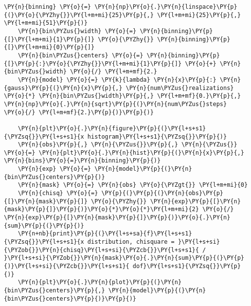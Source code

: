 \begin{Verbatim}[label=\makebox{\href{https://github.com/unipi-physics-labs/lab1-sheets/tree/main/snippy/random_walk.py}{https://github.com/.../random\_walk.py}},commandchars=\\\{\}]
    \PY{n}{binning} \PY{o}{=} \PY{n}{np}\PY{o}{.}\PY{n}{linspace}\PY{p}{(}\PY{o}{\PYZhy{}}\PY{l+m+mi}{25}\PY{p}{,} \PY{l+m+mi}{25}\PY{p}{,} \PY{l+m+mi}{51}\PY{p}{)}
    \PY{n}{bin\PYZus{}width} \PY{o}{=} \PY{n}{binning}\PY{p}{[}\PY{l+m+mi}{1}\PY{p}{]} \PY{o}{\PYZhy{}} \PY{n}{binning}\PY{p}{[}\PY{l+m+mi}{0}\PY{p}{]}
    \PY{n}{bin\PYZus{}centers} \PY{o}{=} \PY{n}{binning}\PY{p}{[}\PY{p}{:}\PY{o}{\PYZhy{}}\PY{l+m+mi}{1}\PY{p}{]} \PY{o}{+} \PY{n}{bin\PYZus{}width} \PY{o}{/} \PY{l+m+mf}{2.}
    \PY{n}{model} \PY{o}{=} \PY{k}{lambda} \PY{n}{x}\PY{p}{:} \PY{n}{gauss}\PY{p}{(}\PY{n}{x}\PY{p}{,} \PY{n}{num\PYZus{}realizations} \PY{o}{*} \PY{n}{bin\PYZus{}width}\PY{p}{,} \PY{l+m+mf}{0.}\PY{p}{,} \PY{n}{np}\PY{o}{.}\PY{n}{sqrt}\PY{p}{(}\PY{n}{num\PYZus{}steps} \PY{o}{/} \PY{l+m+mf}{2.}\PY{p}{)}\PY{p}{)}

    \PY{n}{plt}\PY{o}{.}\PY{n}{figure}\PY{p}{(}\PY{l+s+s1}{\PYZsq{}}\PY{l+s+s1}{x histogram}\PY{l+s+s1}{\PYZsq{}}\PY{p}{)}
    \PY{n}{obs}\PY{p}{,} \PY{n}{\PYZus{}}\PY{p}{,} \PY{n}{\PYZus{}} \PY{o}{=} \PY{n}{plt}\PY{o}{.}\PY{n}{hist}\PY{p}{(}\PY{n}{x}\PY{p}{,} \PY{n}{bins}\PY{o}{=}\PY{n}{binning}\PY{p}{)}
    \PY{n}{exp} \PY{o}{=} \PY{n}{model}\PY{p}{(}\PY{n}{bin\PYZus{}centers}\PY{p}{)}
    \PY{n}{mask} \PY{o}{=} \PY{n}{obs} \PY{o}{\PYZgt{}} \PY{l+m+mi}{0}
    \PY{n}{chisq} \PY{o}{=} \PY{p}{(}\PY{p}{(}\PY{n}{obs}\PY{p}{[}\PY{n}{mask}\PY{p}{]} \PY{o}{\PYZhy{}} \PY{n}{exp}\PY{p}{[}\PY{n}{mask}\PY{p}{]}\PY{p}{)}\PY{o}{*}\PY{o}{*}\PY{l+m+mi}{2} \PY{o}{/} \PY{n}{exp}\PY{p}{[}\PY{n}{mask}\PY{p}{]}\PY{p}{)}\PY{o}{.}\PY{n}{sum}\PY{p}{(}\PY{p}{)}
    \PY{n+nb}{print}\PY{p}{(}\PY{l+s+sa}{f}\PY{l+s+s1}{\PYZsq{}}\PY{l+s+s1}{x distribution, chisquare = }\PY{l+s+si}{\PYZob{}}\PY{n}{chisq}\PY{l+s+si}{\PYZcb{}}\PY{l+s+s1}{ / }\PY{l+s+si}{\PYZob{}}\PY{n}{mask}\PY{o}{.}\PY{n}{sum}\PY{p}{(}\PY{p}{)}\PY{l+s+si}{\PYZcb{}}\PY{l+s+s1}{ dof}\PY{l+s+s1}{\PYZsq{}}\PY{p}{)}
    \PY{n}{plt}\PY{o}{.}\PY{n}{plot}\PY{p}{(}\PY{n}{bin\PYZus{}centers}\PY{p}{,} \PY{n}{model}\PY{p}{(}\PY{n}{bin\PYZus{}centers}\PY{p}{)}\PY{p}{)}


\end{Verbatim}

